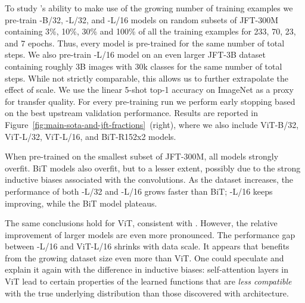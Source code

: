 To study \name{}'s ability to make use of the growing number of training examples we pre-train \name{}-B/32, \name{}-L/32, and \name{}-L/16 models on random subsets of JFT-300M containing 3\%, 10\%, 30\% and 100\% of all the training examples for 233, 70, 23, and 7 epochs. Thus, every model is pre-trained for the same number of total steps.
We also pre-train \name{}-L/16 model on an even larger JFT-3B dataset \cite{vitg} containing roughly 3B images with 30k classes for the same number of total steps. While not strictly comparable, this allows us to further extrapolate the effect of scale.
We use the linear 5-shot top-1 accuracy on ImageNet as a proxy for transfer quality.
For every pre-training run we perform early stopping based on the best upstream validation performance.
Results are reported in Figure~\ref{fig:main-sota-and-jft-fractions}~(right), where we also include ViT-B/32, ViT-L/32, ViT-L/16, and BiT-R152x2 models. 

When pre-trained on the smallest subset of JFT-300M, all \name{} models strongly overfit. 
BiT models also overfit, but to a lesser extent, possibly due to the strong inductive biases associated with the convolutions.
As the dataset increases, the performance of both \name{}-L/32 and \name{}-L/16 grows faster than BiT; \name{}-L/16 keeps improving, while the BiT model plateaus.

The same conclusions hold for ViT, consistent with \citet{Dosovitskiy2021}. However, the relative improvement of larger \name{} models are even more pronounced.
The performance gap between \name{}-L/16 and ViT-L/16 shrinks with data scale.
It appears that \name{} benefits from the growing
dataset size even more than ViT. 
One could speculate and explain it again with the difference in inductive biases:
self-attention layers in ViT lead to certain properties of the learned functions that are \emph{less compatible} with the true underlying distribution than those discovered with \name{} architecture.

